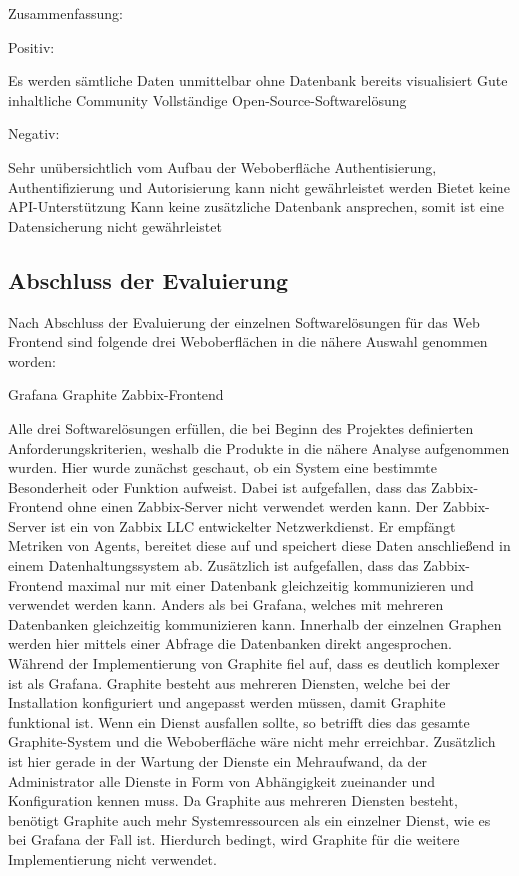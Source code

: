 Zusammenfassung:

Positiv:

\begin{outline}
  \1 Es werden sämtliche Daten unmittelbar ohne Datenbank bereits visualisiert
  \1 Gute inhaltliche Community
  \1 Vollständige Open-Source-Softwarelösung
\end{outline}

Negativ:

\begin{outline}
  \1 Sehr unübersichtlich vom Aufbau der Weboberfläche
  \1 Authentisierung, Authentifizierung und Autorisierung kann nicht
  gewährleistet werden
  \1 Bietet keine API-Unterstützung
  \1 Kann keine zusätzliche Datenbank ansprechen, somit ist eine Datensicherung
  nicht gewährleistet
\end{outline}
\mr%

\subsection{Abschluss der Evaluierung}
\label{subsec:abschluss_evaluierung}
Nach Abschluss der Evaluierung der einzelnen Softwarelösungen für das Web
Frontend sind folgende drei Weboberflächen in die nähere Auswahl genommen
worden:

\begin{outline}
  \1 Grafana
  \1 Graphite
  \1 Zabbix-Frontend
\end{outline}

Alle drei Softwarelösungen erfüllen, die bei Beginn des Projektes definierten
Anforderungskriterien, weshalb die Produkte in die nähere Analyse aufgenommen
wurden. Hier wurde zunächst geschaut, ob ein System eine bestimmte Besonderheit
oder Funktion aufweist. Dabei ist aufgefallen, dass das Zabbix-Frontend ohne
einen Zabbix-Server nicht verwendet werden kann. Der Zabbix-Server ist ein von
Zabbix LLC entwickelter Netzwerkdienst. Er empfängt Metriken von Agents,
bereitet diese auf und speichert diese Daten anschließend in einem
Datenhaltungssystem ab. Zusätzlich ist aufgefallen, dass das Zabbix-Frontend
maximal nur mit einer Datenbank gleichzeitig kommunizieren und verwendet werden
kann. Anders als bei Grafana, welches mit mehreren Datenbanken gleichzeitig
kommunizieren kann. Innerhalb der einzelnen Graphen werden hier mittels einer
Abfrage die Datenbanken direkt angesprochen. Während der Implementierung von
Graphite fiel auf, dass es deutlich komplexer ist als Grafana. Graphite besteht
aus mehreren Diensten, welche bei der Installation konfiguriert und
angepasst werden müssen, damit Graphite funktional ist. Wenn ein Dienst
ausfallen sollte, so betrifft dies das gesamte Graphite-System und die
Weboberfläche wäre nicht mehr erreichbar. Zusätzlich ist hier gerade in der
Wartung der Dienste ein Mehraufwand, da der Administrator alle Dienste in Form
von Abhängigkeit zueinander und Konfiguration kennen muss. Da Graphite aus
mehreren Diensten besteht, benötigt Graphite auch mehr Systemressourcen als ein
einzelner Dienst, wie es bei Grafana der Fall ist. Hierdurch bedingt, wird
Graphite für die weitere Implementierung nicht verwendet.




